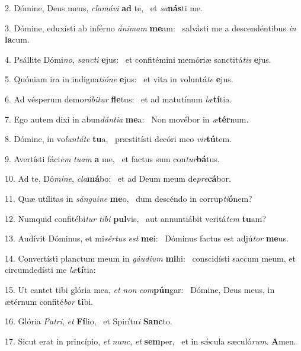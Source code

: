 2. Dómine, Deus meus, \textit{cla}\textit{má}\textit{vi} \textbf{ad} te, \ast\  et \textit{sa}\textbf{nás}ti me.\

3. Dómine, eduxísti ab inférno \textit{á}\textit{ni}\textit{mam} \textbf{me}am: \ast\  salvásti me a descendéntibus \textit{in} \textbf{la}cum.\

4. Psállite Dómi\textit{no}, \textit{sanc}\textit{ti} \textbf{e}jus: \ast\  et confitémini memóriæ sanctitá\textit{tis} \textbf{e}jus.\

5. Quóniam ira in indigna\textit{ti}\textit{ó}\textit{ne} \textbf{e}jus: \ast\  et vita in voluntá\textit{te} \textbf{e}jus.\

6. Ad vésperum demo\textit{rá}\textit{bi}\textit{tur} \textbf{fle}tus: \ast\  et ad matutínum \textit{læ}\textbf{tí}tia.\

7. Ego autem dixi in abun\textit{dán}\textit{ti}\textit{a} \textbf{me}a: \ast\  Non movébor in \textit{æ}\textbf{tér}num.\

8. Dómine, in vo\textit{lun}\textit{tá}\textit{te} \textbf{tu}a, \ast\  præstitísti decóri meo \textit{vir}\textbf{tú}tem.\

9. Avertísti fáci\textit{em} \textit{tu}\textit{am} \textbf{a} me, \ast\  et factus sum con\textit{tur}\textbf{bá}tus.\

10. Ad te, Dó\textit{mi}\textit{ne}, \textit{cla}\textbf{má}bo: \ast\  et ad Deum meum de\textit{pre}\textbf{cá}bor.\

11. Quæ utílitas in \textit{sán}\textit{gui}\textit{ne} \textbf{me}o, \ast\  dum descéndo in corrup\textit{ti}\textbf{ó}nem?\

12. Numquid confitébi\textit{tur} \textit{ti}\textit{bi} \textbf{pul}vis, \ast\  aut annuntiábit veritá\textit{tem} \textbf{tu}am?\

13. Audívit Dóminus, et mi\textit{sér}\textit{tus} \textit{est} \textbf{me}i: \ast\  Dóminus factus est adjú\textit{tor} \textbf{me}us.\

14. Convertísti planctum meum in \textit{gáu}\textit{di}\textit{um} \textbf{mi}hi: \ast\  conscidísti saccum meum, et circumdedísti me \textit{læ}\textbf{tí}tia:\

15. Ut cantet tibi glória mea, \textit{et} \textit{non} \textit{com}\textbf{pún}gar: \ast\  Dómine, Deus meus, in ætérnum confité\textit{bor} \textbf{ti}bi.\

16. Glória \textit{Pa}\textit{tri}, \textit{et} \textbf{Fí}lio, \ast\  et Spirítu\textit{i} \textbf{Sanc}to.\

17. Sicut erat in princípio, \textit{et} \textit{nunc}, \textit{et} \textbf{sem}per, \ast\  et in sǽcula sæculó\textit{rum}. \textbf{A}men.\

